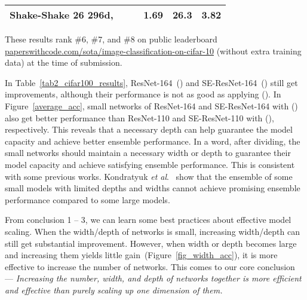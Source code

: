 \documentclass[lettersize,journal]{IEEEtran}
\newcommand{\etal}{\textit{et al}.}
\begin{document}
\begin{table}[!t]
{\begin{threeparttable}
\begin{tabular}{lcccc}
				Shake-Shake 26 296d,~
				& 
				& ~\textbf{1.69}
				& 26.3	
				& 3.82			\\
\bottomrule	
			\end{tabular} 
			{\footnotesize \begin{tablenotes}
					\item[] These results rank \#6, \#7, and \#8 on public leaderboard
					 \href{https://paperswithcode.com/sota/image-classification-on-cifar-10}{paperswithcode.com/sota/image-classification-on-cifar-10} (without extra training data)
at the time of submission.
			\end{tablenotes}}
		\end{threeparttable}
	}
\end{table} 
In Table~\ref{tab2_cifar100_results}, 
ResNet-164~() and SE-ResNet-164~() still get improvements, although
their performance is not as good as applying ().  
In Figure~\ref{average_acc}, small networks of ResNet-164 and 
SE-ResNet-164 with () also get better performance than
ResNet-110 and SE-ResNet-110 with (), respectively.
This reveals that a necessary depth can help guarantee the
model capacity and achieve better ensemble performance.
In a word, after dividing, 
the small networks should maintain a necessary width or depth to guarantee their model
capacity and achieve satisfying ensemble performance.
This is consistent with some previous works.
Kondratyuk \etal~\cite{kondratyukWhenEnsemblingSmaller2020}
show that the ensemble of some small models with limited depths and widths cannot
achieve promising ensemble performance compared to some large models.

From conclusion 1 -- 3, we can learn some best practices about effective model scaling.
When the width/depth of networks is small,
increasing width/depth can still get substantial improvement.
However, when width or depth becomes large and 
increasing them yields little gain~(Figure~\ref{fig_width_acc}),
it is more effective to increase the number of networks.
This comes to our core conclusion --- \emph{Increasing the
number, width, and depth of networks together
is more efficient and effective than purely scaling up one dimension
of them.}
\end{document}
